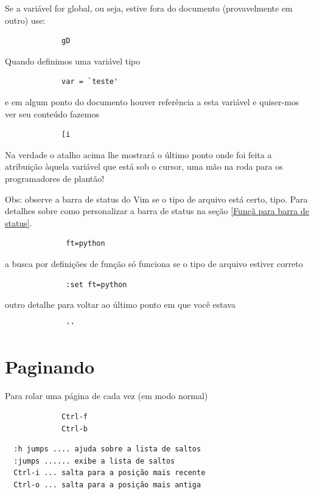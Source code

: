 \documentclass[10pt,a4paper,openany]{book}
\begin{document}
Se a variável for global, ou seja, estive fora do documento
(provavelmente em outro) use:

\begin{verbatim}
			 gD
\end{verbatim}

Quando definimos uma variável tipo

\begin{verbatim}
			 var = `teste'
\end{verbatim}

e em algum ponto do documento houver referência a esta variável e
quiser-mos ver seu conteúdo fazemos

\begin{verbatim}
			 [i
\end{verbatim}
Na verdade o atalho acima lhe mostrará o último ponto onde foi feita
a atribuição àquela variável que está sob o cursor, uma mão na roda
para os programadores de plantão!

Obs: observe a  barra de status do Vim se o tipo de arquivo está certo,
tipo. Para detalhes sobre como personalizar a barra de status na seção
\ref{Funçã para barra de status}.

\begin{verbatim}
			  ft=python
\end{verbatim}

a busca por definições de função só funciona se o tipo de arquivo
estiver correto

\begin{verbatim}
			  :set ft=python
\end{verbatim}

outro detalhe para voltar ao último ponto em que você estava

\begin{verbatim}
			  ''
\end{verbatim}

\section{Paginando}
\label{Paginando}

Para rolar uma página de cada vez (em modo normal)

\begin{verbatim}
			 Ctrl-f
			 Ctrl-b
\end{verbatim}


\begin{verbatim}
  :h jumps .... ajuda sobre a lista de saltos
  :jumps ...... exibe a lista de saltos
  Ctrl-i ... salta para a posição mais recente
  Ctrl-o ... salta para a posição mais antiga
\end{verbatim}
\end{document}
